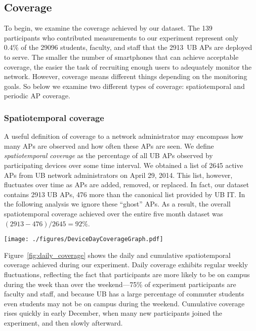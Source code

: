 \subsection{Coverage}
\label{subsec:coverage}

To begin, we examine the coverage achieved by our dataset. The
139~\PhoneLab{} participants who contributed measurements to our experiment
represent only 0.4\% of the \num{29096} students, faculty, and staff that the
\num{2913}~UB APs are deployed to serve. The smaller the number of
smartphones that can achieve acceptable coverage, the easier the task of
recruiting enough users to adequately monitor the network. However, coverage
means different things depending on the monitoring goals. So below we examine
two different types of coverage: spatiotemporal and periodic AP coverage.

\subsubsection{Spatiotemporal coverage}
\label{subsubsec:coverage}

A useful definition of coverage to a network administrator may encompass how
many APs are observed and how often these APs are seen. We define
\textit{spatiotemporal coverage} as the percentage of all UB APs observed by
participating devices over some time interval. We obtained a list of
\num{2645} active APs from UB network administrators on April 29, 2014. This
list, however, fluctuates over time as APs are added, removed, or replaced.
In fact, our dataset contains \num{2913} UB APs, \num{476} more than the
canonical list provided by UB IT. In the following analysis we ignore these
``ghost'' APs. As a result, the overall spatiotemporal coverage achieved over
the entire five month dataset was $(2913-476)/2645=92\%$.

\begin{figure*}[t]
  \centering
  \texttt{[image: ./figures/DeviceDayCoverageGraph.pdf]}
  \caption{\textbf{Daily and Cumulative Spatiotemporal Coverage.} Mondays on
  the graph are labeled. Coverage shows weekly fluctuations.}
  \label{fig:daily_coverage}
\end{figure*}

Figure~\ref{fig:daily_coverage} shows the daily and cumulative spatiotemporal
coverage achieved during our experiment. Daily coverage exhibits regular
weekly fluctuations, reflecting the fact that \PhoneLab{} participants are
more likely to be on campus during the week than over the weekend---75\% of
experiment participants are faculty and staff, and because UB has a large
percentage of commuter students even students may not be on campus during the
weekend. Cumulative coverage rises quickly in early December, when many new
participants joined the experiment, and then slowly afterward.

